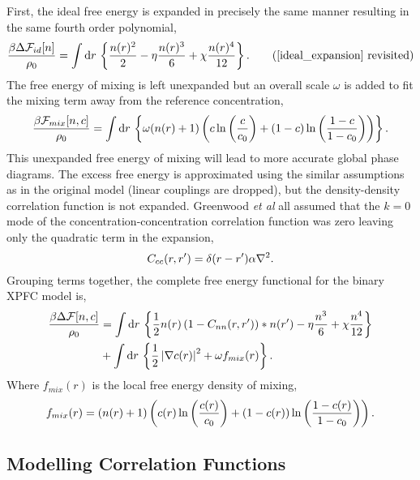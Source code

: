 First, the ideal free energy is expanded in precisely the same manner resulting
in the same fourth order polynomial,
%
\begin{equation}
    \f{\beta\Delta\F_{id}[n]}{\rho_0} = \integrate{r}
        \l\lbrace \f{n(r)^2}{2} - \eta \f{n(r)^3}{6} + \chi\f{n(r)^4}{12}
        \r\rbrace. \tag{\ref{ideal_expansion} revisited}
\end{equation}
%
The free energy of mixing is left unexpanded but an overall scale $\omega$ is
added to fit the mixing term away from the reference concentration,
%
\begin{equation}
    \frac{\beta\mathcal{F}_{mix}[n, c]}{\rho_0} =
        \int \mathrm{d}r\, \left\lbrace \omega (n(r) + 1)\left( 
            c\ln\left(\frac{c}{c_0}\right) + (1-c)\ln\left(\frac{1-c}{1-c_0}\right) \right)\right\rbrace. 
\end{equation}
%
This unexpanded free energy of mixing will lead to more accurate global phase
diagrams. The excess free energy is approximated using the similar assumptions
as in the original model (linear couplings are dropped), but the density-density
correlation function is not expanded. Greenwood \textit{et al} all assumed that
the $k=0$ mode of the concentration-concentration correlation function was zero
leaving only the quadratic term in the expansion,
%
\begin{equation}
    C_{cc}(r, r^\prime) = \delta(r - r^\prime)\alpha \nabla^2.
\end{equation}
%
Grouping terms together, the complete free energy functional for the binary XPFC
model is,
%
\begin{align}
    \frac{\beta\Delta\mathcal{F}[n, c]}{\rho_0} &= \int \mathrm{d}r\, \left\lbrace
        \frac{1}{2} n(r) \left(1 - C_{nn}(r, r^\prime)\right) \ast n(r^\prime)
        - \eta \frac{n^3}{6} + \chi \frac{n^4}{12} \right\rbrace \\
        &+ \int \mathrm{d}r\,\left\lbrace
            \frac{1}{2}\left\vert \nabla c(r) \right\vert^2 + \omega f_{mix}(r)
            \right\rbrace. \nonumber
\end{align}
%
Where $f_{mix}(r)$ is the local free energy density of mixing,
%
\begin{equation}
    f_{mix}(r) = \left(n(r) + 1\right)\left( 
            c(r)\ln\left(\frac{c(r)}{c_0}\right) + (1-c(r))\ln\left(\frac{1-c(r)}{1-c_0}\right) \right).
\end{equation}
%

\subsection{Modelling Correlation Functions} %

